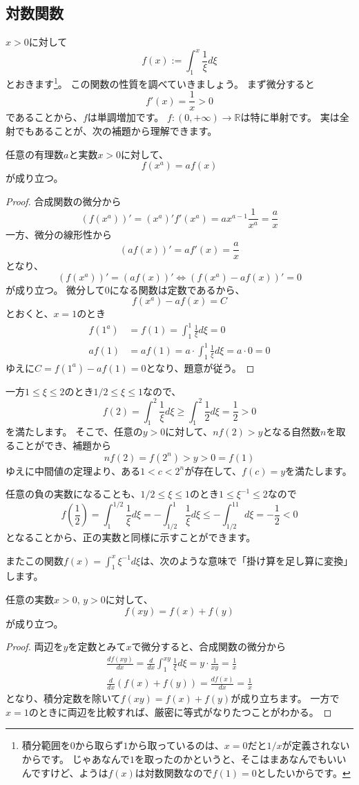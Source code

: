 \subsection{対数関数}

$x>0$に対して
\[
  f(x):=\int_1^x\frac{1}{\xi}d\xi
\]
とおきます\footnote{
  積分範囲を$0$から取らず$1$から取っているのは、$x=0$だと$1/x$が定義されないからです。
  じゃあなんで$1$を取ったのかというと、そこはまあなんでもいいんですけど、ようは$f(x)$は対数関数なので$f(1)=0$としたいからです。
}。
この関数の性質を調べていきましょう。
まず微分すると
\[
  f'(x)=\frac1x>0
\]
であることから、$f$は単調増加です。
$f:(0,+\infty)\to\mathbb{R}$は特に単射です。
実は全射でもあることが、次の補題から理解できます。
\begin{lemma}
  任意の有理数$a$と実数$x>0$に対して、
  \[
    f(x^a)=af(x)
  \]
  が成り立つ。
\end{lemma}
\begin{proof}
  合成関数の微分から
  \[
    (f(x^a))'=(x^a)'f'(x^a)=ax^{a-1}\frac1{x^a}=\frac{a}{x}
  \]
  一方、微分の線形性から
  \[
    (af(x))'=af'(x)=\frac{a}{x}
  \]
  となり、
  \[
    (f(x^a))'=(af(x))'\iff (f(x^a)-af(x))'=0
  \]
  が成り立つ。
  微分して0になる関数は定数であるから、
  \[
    f(x^a)-af(x)=C
  \]
  とおくと、$x=1$のとき
  \begin{align*}
    f(1^a)&=f(1)=\int_1^{1}\frac1\xi d\xi=0\\
    af(1)&=af(1)=a\cdot\int_1^{1}\frac1\xi d\xi=a\cdot0=0
  \end{align*}
  ゆえに$C=f(1^a)-af(1)=0$となり、題意が従う。
\end{proof}
一方$1\leq\xi\leq2$のとき$1/2\leq\xi\leq1$なので、
\[
  f(2)=\int_1^2 \frac1\xi d\xi \geq \int_1^2 \frac12 d\xi=\frac12>0
\]
を満たします。
そこで、任意の$y>0$に対して、$nf(2)>y$となる自然数$n$を取ることができ、補題から
\[
  nf(2)=f(2^n)>y>0=f(1)
\]
ゆえに中間値の定理より、ある$1<c<2^n$が存在して、$f(c)=y$を満たします。

任意の負の実数になることも、$1/2\leq\xi\leq1$のとき$1\leq\xi^{-1}\leq2$なので
\[
  f\left(\frac12\right)=\int_1^{1/2}\frac1\xi d\xi=-\int_{1/2}^1\frac1\xi d\xi\leq-\int_{1/2}^11d\xi=-\frac12<0
\]
となることから、正の実数と同様に示すことができます。

またこの関数$f(x)=\int_1^x\xi^{-1}d\xi$は、次のような意味で「掛け算を足し算に変換」します。
\begin{theorem}
  任意の実数$x>0$, $y>0$に対して、
  \[
    f(xy)=f(x)+f(y)
  \]
  が成り立つ。
\end{theorem}
\begin{proof}
  両辺を$y$を定数とみて$x$で微分すると、合成関数の微分から
  \begin{align*}
    \frac{df(xy)}{dx}=\frac{d}{dx}\int_1^{xy}\frac1\xi d\xi=y\cdot\frac1{xy}=\frac1x\\
    \frac{d}{dx}(f(x)+f(y))=\frac{df(x)}{dx}=\frac1x
  \end{align*}
  となり、積分定数を除いて$f(xy)=f(x)+f(y)$が成り立ちます。
  一方で$x=1$のときに両辺を比較すれば、厳密に等式がなりたつことがわかる。
\end{proof}

